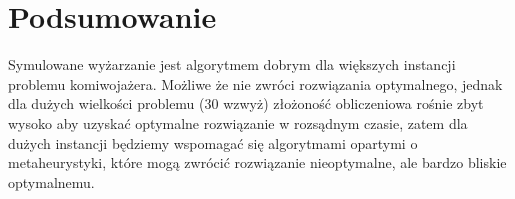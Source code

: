 \documentclass[a4paper]{article}
\begin{document}
\section{Podsumowanie}

Symulowane wyżarzanie jest algorytmem dobrym dla większych instancji problemu
komiwojażera. Możliwe że nie zwróci rozwiązania optymalnego, jednak dla dużych
wielkości problemu (30 wzwyż) złożoność obliczeniowa rośnie zbyt wysoko aby
uzyskać optymalne rozwiązanie w rozsądnym czasie, zatem dla dużych instancji
będziemy wspomagać się algorytmami opartymi o metaheurystyki, które mogą zwrócić
rozwiązanie nieoptymalne, ale bardzo bliskie optymalnemu.
\end{document}
